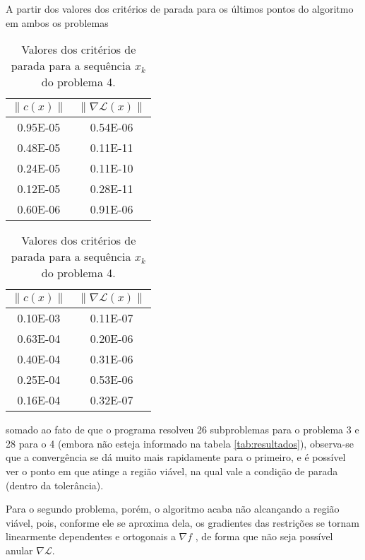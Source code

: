 	A partir dos valores dos critérios de parada para os últimos pontos
	do algoritmo em ambos os problemas
	\begin{table}[h!]
		\centering
		\begin{minipage}{.45\linewidth}
			\centering
			\begin{tabular}{cc}
				$\| c(x) \|$ & $\| \nabla \mathcal{L}(x) \|$ \\
				\hline
				0.95E-05 &   0.54E-06 \\
				0.48E-05 &   0.11E-11 \\
				0.24E-05 &   0.11E-10 \\
				0.12E-05 &   0.28E-11 \\
				0.60E-06 &   0.91E-06 \\
			\end{tabular}
			\caption{Valores dos critérios de parada para a sequência $x_k$ do problema 3.}
		\end{minipage}%
		\hspace{0.1\linewidth}%
		\begin{minipage}[r]{.45\linewidth}
			\centering
			\begin{tabular}{cc}
				$\| c(x) \|$ & $\| \nabla \mathcal{L}(x) \|$ \\
				\hline
				0.10E-03 &   0.11E-07 \\
				0.63E-04 &   0.20E-06 \\
				0.40E-04 &   0.31E-06 \\
				0.25E-04 &   0.53E-06 \\
				0.16E-04 &   0.32E-07 \\
			\end{tabular}
			\caption{Valores dos critérios de parada para a sequência $x_k$ do problema 4.}
		\end{minipage}
	\end{table}

	somado ao fato de que o programa resolveu 26 subproblemas para o problema 3 e
	28 para o 4 (embora não esteja informado na tabela \ref{tab:resultados}),
	observa-se que a convergência se dá muito mais rapidamente para o primeiro,
	e é possível ver o ponto em que atinge a região viável, na qual vale a condição
	de parada (dentro da tolerância).

	Para o segundo problema, porém, o algoritmo
	acaba não alcançando a região viável, pois, conforme ele se aproxima dela,
	os gradientes das restrições se tornam linearmente dependentes e ortogonais
	a $\nabla f$ , de forma que
	não seja possível anular $\nabla \mathcal{L}$.
